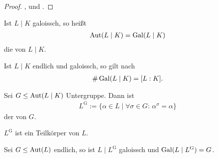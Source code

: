 \begin{proof}
	,  und .
\end{proof}

\begin{definition}
	Ist $L\mid K$ galoissch, so heißt \begin{align*}
		\operatorname{Aut}(L\mid K) = \operatorname{Gal}(L\mid K)
	\end{align*}
	die  von $L\mid K$.
\end{definition}

\begin{remark}
	Ist $L\mid K$ endlich und galoissch, so gilt nach  \begin{align*}
		\#\operatorname{Gal}(L\mid K) = [L:K].
	\end{align*}
\end{remark}

\begin{definition}
	Sei $G\le \operatorname{Aut}(L\mid K)$ Untergruppe. Dann ist\begin{align*}
		L^{\mathrm G} := \big\lbrace \alpha\in L\;\big|\; \forall \sigma\in G\colon\, \alpha^\sigma = \alpha\big\rbrace
	\end{align*}
	der  von $G$.
\end{definition}

\begin{remark}
	$L^{\mathrm G}$ ist ein Teilkörper von $L$.
\end{remark}

\begin{proposition}[Artin]
	Sei $G\le \operatorname{Aut}(L)$ endlich, so ist $L\mid L^{\mathrm G}$ galoissch und $\operatorname{Gal}(L\mid L^{\mathrm G}) = G$.
\end{proposition}

